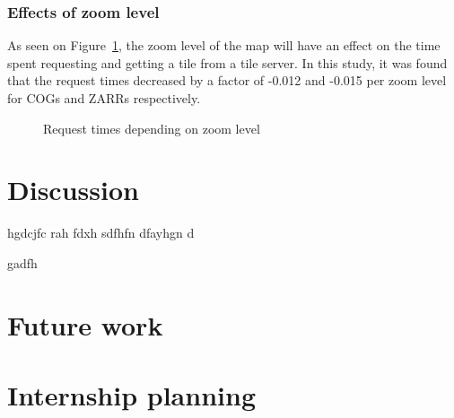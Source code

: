 \documentclass[
  oneside,
  open=any]{scrbook}
\begin{document}
\subsection{Effects of zoom level}\label{effects-of-zoom-level}

As seen on Figure~\ref{fig-comp-zoom}, the zoom level of the map will
have an effect on the time spent requesting and getting a tile from a
tile server. In this study, it was found that the request times
decreased by a factor of -0.012 and -0.015 per zoom level for COGs and
ZARRs respectively.

\begin{figure}[H]


\caption{\label{fig-comp-zoom}Request times depending on zoom level}

\end{figure}%

\chapter{Discussion}\label{discussion}

hgdcjfc rah fdxh sdfhfn dfayhgn d

gadfh

\chapter{Future work}\label{future-work}

\chapter{Internship planning}\label{internship-planning}
\end{document}

